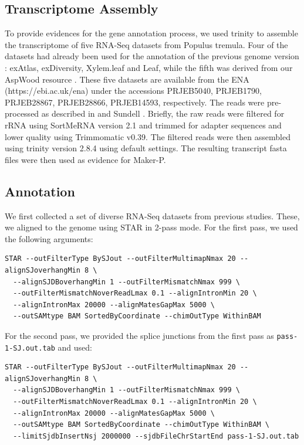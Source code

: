 \documentclass{article}
\begin{document}
\subsection{Transcriptome Assembly}
To provide evidences for the gene annotation process, we used trinity \citep{grabherr2011trinity} to assemble the transcriptome of five RNA-Seq \citep{mortazavi2008mapping} datasets from Populus tremula. Four of the datasets had already been used for the annotation of the previous genome version \citep{LinE10970}: exAtlas, exDiversity, Xylem.leaf and Leaf, while the fifth was derived from our AspWood resource \citep{sundell2017aspwood}. These five datasets are available from the ENA (https://ebi.ac.uk/ena) under the accessions PRJEB5040, PRJEB1790, PRJEB28867, PRJEB28866, PRJEB14593, respectively.
The reads were pre-processed as described in \cite{LinE10970} and Sundell \cite{sundell2017aspwood}. Briefly, the raw reads were filtered for rRNA using SortMeRNA \citep{kopylova2012sortmerna} version 2.1 and trimmed for adapter sequences and lower quality using Trimmomatic \citep{bolger2014trimmomatic} v0.39. The filtered reads were then assembled using trinity \citep{haas2013novo} version 2.8.4 using default settings. The resulting transcript fasta files were then used as evidence for Maker-P.

\subsection{Annotation}
We first collected a set of diverse RNA-Seq datasets from previous studies. These, we aligned to the genome using STAR in 2-pass mode. For the first pass, we used the following arguments:\\

\begin{verbatim}
STAR --outFilterType BySJout --outFilterMultimapNmax 20 --alignSJoverhangMin 8 \
  --alignSJDBoverhangMin 1 --outFilterMismatchNmax 999 \
  --outFilterMismatchNoverReadLmax 0.1 --alignIntronMin 20 \
  --alignIntronMax 20000 --alignMatesGapMax 5000 \
  --outSAMtype BAM SortedByCoordinate --chimOutType WithinBAM 
\end{verbatim}

For the second pass, we provided the splice junctions from the first pass as \verb|pass-1-SJ.out.tab| and used:\\

\begin{verbatim}
STAR --outFilterType BySJout --outFilterMultimapNmax 20 --alignSJoverhangMin 8 \
  --alignSJDBoverhangMin 1 --outFilterMismatchNmax 999 \
  --outFilterMismatchNoverReadLmax 0.1 --alignIntronMin 20 \
  --alignIntronMax 20000 --alignMatesGapMax 5000 \
  --outSAMtype BAM SortedByCoordinate --chimOutType WithinBAM \
  --limitSjdbInsertNsj 2000000 --sjdbFileChrStartEnd pass-1-SJ.out.tab  
\end{verbatim}
\end{document}
